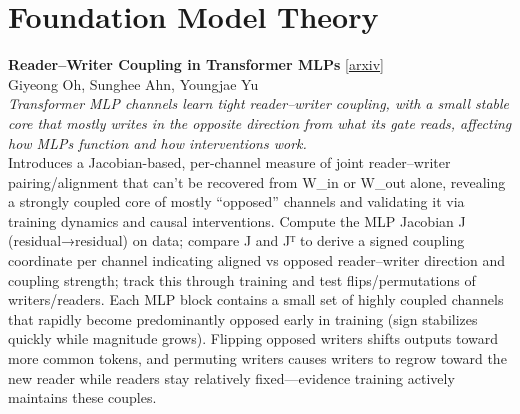 \documentclass[12pt,letterpaper]{article}
\begin{document}
\medskip


\section*{Foundation Model Theory}

{\small\textbf{Reader--Writer Coupling in Transformer MLPs}} {\scriptsize[\href{https://arxiv.org/abs/2610.29340}{arxiv}]}\\
{\scriptsize Giyeong Oh, Sunghee Ahn, Youngjae Yu}\\

{\small\textit{Transformer MLP channels learn tight reader--writer coupling, with a small stable core that mostly writes in the opposite direction from what its gate reads, affecting how MLPs function and how interventions work.}}\\[1pt]
{\footnotesize Introduces a Jacobian-based, per-channel measure of joint reader--writer pairing/alignment that can't be recovered from W\_in or W\_out alone, revealing a strongly coupled core of mostly ``opposed'' channels and validating it via training dynamics and causal interventions. Compute the MLP Jacobian J (residual→residual) on data; compare J and Jᵀ to derive a signed coupling coordinate per channel indicating aligned vs opposed reader--writer direction and coupling strength; track this through training and test flips/permutations of writers/readers. Each MLP block contains a small set of highly coupled channels that rapidly become predominantly opposed early in training (sign stabilizes quickly while magnitude grows). Flipping opposed writers shifts outputs toward more common tokens, and permuting writers causes writers to regrow toward the new reader while readers stay relatively fixed---evidence training actively maintains these couples.}

\medskip
\end{document}
